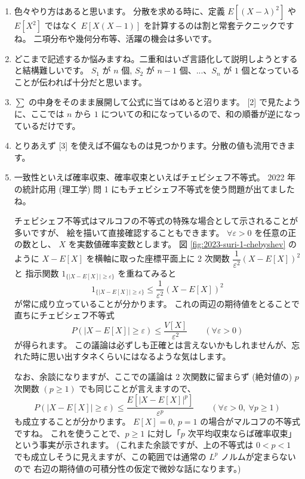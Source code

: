 \documentclass[./main.tex]{subfiles}
\begin{document}
    \begin{enumerate}
        \item 色々やり方はあると思います。
        分散を求める時に、定義 $E[(X - \lambda)^2]$ や $E[X^2]$ ではなく $E[X(X - 1)]$ を計算するのは割と常套テクニックですね。
        二項分布や幾何分布等、活躍の機会は多いです。
        \item どこまで記述するか悩みますね。二重和はいざ言語化して説明しようとすると結構難しいです。
        $S_1$ が $n$ 個, $S_2$ が $n - 1$ 個、...、$S_n$ が $1$ 個となっていることが伝われば十分だと思います。
        \item $\displaystyle \sum$ の中身をそのまま展開して公式に当てはめると沼ります。
        [2] で見たように、ここでは $n$ から $1$ についての和になっているので、和の順番が逆になっているだけです。
        \item とりあえず [3] を使えば不偏なものは見つかります。分散の値も流用できます。
        \item 一致性といえば確率収束、確率収束といえばチェビシェフ不等式。
        2022 年の統計応用 (理工学) 問 1 にもチェビシェフ不等式を使う問題が出てましたね。

        チェビシェフ不等式はマルコフの不等式の特殊な場合として示されることが多いですが、
        絵を描いて直接確認することもできます。
        $\forall \varepsilon > 0$ を任意の正の数とし、 $X$ を実数値確率変数とします。
        図 \ref{fig:2023-suri-1-chebyshev} のように $X - E[X]$ を横軸に取った座標平面上に
        2 次関数 $\dfrac{1}{\varepsilon^2} ( X - E[X])^2 $ と
        指示関数 $1_{\{ \vert X - E[X] \vert \geq \varepsilon \}}$ を重ねてみると
        \begin{equation*}
            1_{ \{ \vert X - E[X] \vert \geq \varepsilon \}}
                \leq \frac{1}{\varepsilon^2} (X - E[X])^2
        \end{equation*}
        が常に成り立っていることが分かります。
        これの両辺の期待値をとることで直ちにチェビシェフ不等式
        \begin{equation*}
            P( \vert X - E[X] \vert \geq \varepsilon)
                \leq \frac{V [X]}{\varepsilon^2}
                \qquad (\forall \varepsilon > 0)
        \end{equation*}
        が得られます。
        この議論は必ずしも正確とは言えないかもしれませんが、忘れた時に思い出すタネくらいにはなるような気はします。

        なお、余談になりますが、ここでの議論は 2 次関数に留まらず (絶対値の) $p$ 次関数 $(p \geq 1)$ でも同じことが言えますので、
        \begin{equation*}
            P( \vert X - E[X] \vert \geq \varepsilon)
                \leq \frac{E \left[ \vert X - E [X] \vert^p \right]}{\varepsilon^p}
                \qquad (\forall \varepsilon > 0, \ \forall p \geq 1)
        \end{equation*}
        も成立することが分かります。
        $E[X] = 0$, $p = 1$ の場合がマルコフの不等式ですね。
        これを使うことで、$p \geq 1$ に対し「$p$ 次平均収束ならば確率収束」という事実が示されます。
        (これまた余談ですが、上の不等式は $0 < p < 1$ でも成立しそうに見えますが、この範囲では通常の $L^p$ ノルムが定まらないので
        右辺の期待値の可積分性の仮定で微妙な話になります。)



\end{enumerate}
\end{document}
